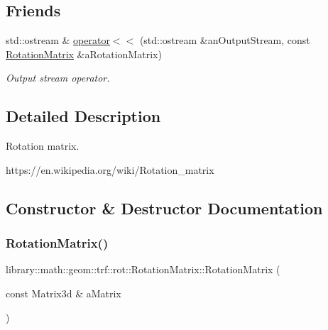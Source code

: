 \subsection*{Friends}
\begin{DoxyCompactItemize}
\item 
std\+::ostream \& \hyperlink{classlibrary_1_1math_1_1geom_1_1trf_1_1rot_1_1_rotation_matrix_aa9ed0897a6219331deeb7750017a0df9}{operator$<$$<$} (std\+::ostream \&an\+Output\+Stream, const \hyperlink{classlibrary_1_1math_1_1geom_1_1trf_1_1rot_1_1_rotation_matrix}{Rotation\+Matrix} \&a\+Rotation\+Matrix)
\begin{DoxyCompactList}\small\item\em Output stream operator. \end{DoxyCompactList}\end{DoxyCompactItemize}


\subsection{Detailed Description}
Rotation matrix. 

https\+://en.wikipedia.\+org/wiki/\+Rotation\+\_\+matrix 

\subsection{Constructor \& Destructor Documentation}
\mbox{\label{classlibrary_1_1math_1_1geom_1_1trf_1_1rot_1_1_rotation_matrix_a667d2c05aa5b0cc88775938d11164cdc}} 
\subsubsection{\texorpdfstring{Rotation\+Matrix()}{RotationMatrix()}\hspace{0.1cm}{\footnotesize\ttfamily [1/2]}}
{\footnotesize\ttfamily library\+::math\+::geom\+::trf\+::rot\+::\+Rotation\+Matrix\+::\+Rotation\+Matrix (\begin{DoxyParamCaption}\item[{const Matrix3d \&}]{a\+Matrix }\end{DoxyParamCaption})}



